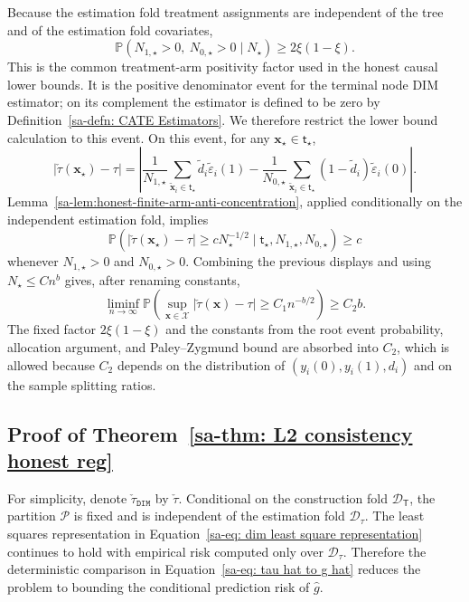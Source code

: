 \documentclass[10pt]{article}
\def\treeT{\mathsf{T}}
\def\nodet{\mathsf{t}}
\def\bx{\mathbf{x}}
\def\P{\mathbb{P}}
\def\dataD{\mathcal{D}}
\def\partitionP{\mathcal{P}}
\theoremstyle{definition}
\theoremstyle{remark}
\begin{document}
Because the estimation fold treatment assignments are independent of the tree and of the estimation fold covariates,
\[
    \P(N_{1,\star}>0,\ N_{0,\star}>0\mid N_\star)\geq 2\xi(1-\xi).
\]
This is the common treatment-arm positivity factor used in the honest causal lower bounds. It is the positive denominator event for the terminal node DIM estimator; on its complement the estimator is defined to be zero by Definition~\ref{sa-defn: CATE Estimators}. We therefore restrict the lower bound calculation to this event.
On this event, for any $\bx_\star\in\nodet_\star$,
\[
    |\check{\tau}(\bx_\star)-\tau|
    =
    \left|
        \frac{1}{N_{1,\star}}\sum_{\tilde{\bx}_i\in\nodet_\star}\tilde d_i\tilde\varepsilon_i(1)
        -
        \frac{1}{N_{0,\star}}\sum_{\tilde{\bx}_i\in\nodet_\star}(1-\tilde d_i)\tilde\varepsilon_i(0)
    \right|.
\]
Lemma~\ref{sa-lem:honest-finite-arm-anti-concentration}, applied conditionally on the independent estimation fold, implies
\[
    \P\!\left(
        |\check{\tau}(\bx_\star)-\tau|\geq c N_\star^{-1/2}
        \mid \nodet_\star,N_{1,\star},N_{0,\star}
    \right)
    \geq c
\]
whenever $N_{1,\star}>0$ and $N_{0,\star}>0$. Combining the previous displays and using $N_\star\leq C n^b$ gives, after renaming constants,
\[
    \liminf_{n\to\infty}
    \P\!\left(\sup_{\bx\in\mathcal X}|\check{\tau}(\bx)-\tau|\geq C_1 n^{-b/2}\right)
    \geq C_2 b.
\]
The fixed factor $2\xi(1-\xi)$ and the constants from the root event probability, allocation argument, and Paley--Zygmund bound are absorbed into $C_2$, which is allowed because $C_2$ depends on the distribution of $(y_i(0),y_i(1),d_i)$ and on the sample splitting ratios.


\subsection{Proof of Theorem~\ref{sa-thm: L2 consistency honest reg}}

For simplicity, denote $\check\tau_{\mathtt{DIM}}$ by $\check{\tau}$. Conditional on the construction fold $\dataD_{\treeT}$, the partition $\partitionP$ is fixed and is independent of the estimation fold $\dataD_{\tau}$. The least squares representation in Equation~\eqref{sa-eq: dim least square representation} continues to hold with empirical risk computed only over $\dataD_{\tau}$. Therefore the deterministic comparison in Equation~\eqref{sa-eq: tau hat to g hat} reduces the problem to bounding the conditional prediction risk of $\hat g$.
\end{document}
